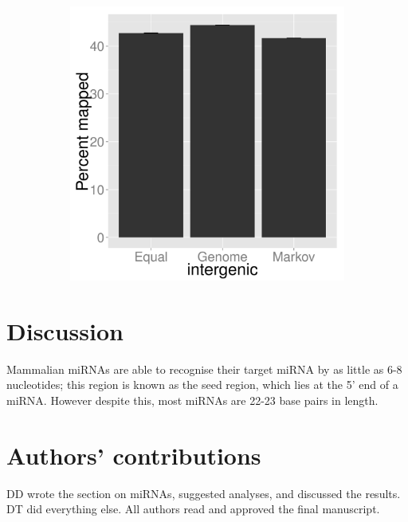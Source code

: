 \documentclass{article}
\begin{document}
\begin{figure}[t]
\begin{subfigure}{.33\columnwidth}
      \caption{}
      \label{fig:22mer_intron}
   \end{subfigure}%
   \begin{subfigure}{.33\columnwidth}
      \centering
      \includegraphics[width=.9\textwidth,natwidth=100,natheight=100]{22mer_intergenic.pdf}
      \caption{}
      \label{fig:22mer_intergenic}
   \end{subfigure}
   \caption{}
   \label{fig:22mer_mapping}
\end{figure}

\section{Discussion}\label{discussion}

Mammalian miRNAs are able to recognise their target miRNA by as little as 6-8 nucleotides; this region is known as the seed region, which lies at the 5' end of a miRNA. However despite this, most miRNAs are 22-23 base pairs in length.

\section{Authors' contributions}

DD wrote the section on miRNAs, suggested analyses, and discussed the results. DT did everything else. All authors read and approved the final manuscript.

\newpage



\end{document}
